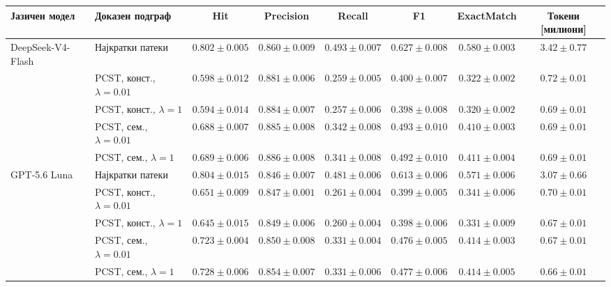 \begin{tabular}{llcccccc}
\toprule
Јазичен модел & Доказен подграф & Hit & Precision & Recall & F1 & ExactMatch & Токени [милиони] \\
\midrule
DeepSeek-V4-Flash & Најкратки патеки & $0.802 \pm 0.005$ & $0.860 \pm 0.009$ & {\boldmath $0.493 \pm 0.007$} & {\boldmath $0.627 \pm 0.008$} & {\boldmath $0.580 \pm 0.003$} & $3.42 \pm 0.77$ \\
 & PCST, конст., $\lambda=0.01$ & $0.598 \pm 0.012$ & $0.881 \pm 0.006$ & $0.259 \pm 0.005$ & $0.400 \pm 0.007$ & $0.322 \pm 0.002$ & $0.72 \pm 0.01$ \\
 & PCST, конст., $\lambda=1$ & $0.594 \pm 0.014$ & $0.884 \pm 0.007$ & $0.257 \pm 0.006$ & $0.398 \pm 0.008$ & $0.320 \pm 0.002$ & $0.69 \pm 0.01$ \\
 & PCST, сем., $\lambda=0.01$ & $0.688 \pm 0.007$ & $0.885 \pm 0.008$ & $0.342 \pm 0.008$ & $0.493 \pm 0.010$ & $0.410 \pm 0.003$ & $0.69 \pm 0.01$ \\
 & PCST, сем., $\lambda=1$ & $0.689 \pm 0.006$ & {\boldmath $0.886 \pm 0.008$} & $0.341 \pm 0.008$ & $0.492 \pm 0.010$ & $0.411 \pm 0.004$ & $0.69 \pm 0.01$ \\
\midrule
GPT-5.6 Luna & Најкратки патеки & {\boldmath $0.804 \pm 0.015$} & $0.846 \pm 0.007$ & $0.481 \pm 0.006$ & $0.613 \pm 0.006$ & $0.571 \pm 0.006$ & $3.07 \pm 0.66$ \\
 & PCST, конст., $\lambda=0.01$ & $0.651 \pm 0.009$ & $0.847 \pm 0.001$ & $0.261 \pm 0.004$ & $0.399 \pm 0.005$ & $0.341 \pm 0.006$ & $0.70 \pm 0.01$ \\
 & PCST, конст., $\lambda=1$ & $0.645 \pm 0.015$ & $0.849 \pm 0.006$ & $0.260 \pm 0.004$ & $0.398 \pm 0.006$ & $0.331 \pm 0.009$ & $0.67 \pm 0.01$ \\
 & PCST, сем., $\lambda=0.01$ & $0.723 \pm 0.004$ & $0.850 \pm 0.008$ & $0.331 \pm 0.004$ & $0.476 \pm 0.005$ & $0.414 \pm 0.003$ & $0.67 \pm 0.01$ \\
 & PCST, сем., $\lambda=1$ & $0.728 \pm 0.006$ & $0.854 \pm 0.007$ & $0.331 \pm 0.006$ & $0.477 \pm 0.006$ & $0.414 \pm 0.005$ & {\boldmath $0.66 \pm 0.01$} \\
\bottomrule
\end{tabular}

